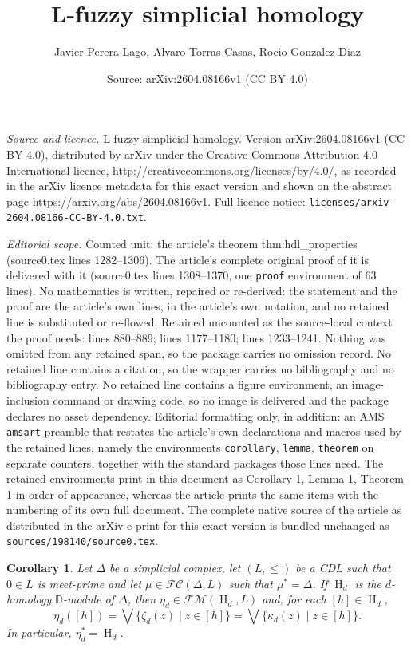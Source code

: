 \documentclass[10pt,a4paper]{amsart}
\title{L-fuzzy simplicial homology}
\author{Javier Perera-Lago, Alvaro Torras-Casas, Rocio Gonzalez-Diaz}
\date{Source: arXiv:2604.08166v1 (CC BY 4.0)}
\newtheorem{corollary}{Corollary}
\DeclareMathOperator{\Ho}{H}
\newcommand{\bbd}{\mathbb{D}}
\newcommand{\calfc}{\mathcal{FC}}
\newcommand{\calfm}{\mathcal{F\!M}}
\begin{document}
\maketitle

\noindent\emph{Source and licence.} L-fuzzy simplicial homology. Version arXiv:2604.08166v1 (CC BY 4.0), distributed by arXiv under the Creative Commons Attribution 4.0 International licence, http://creativecommons.org/licenses/by/4.0/, as recorded in the arXiv licence metadata for this exact version and shown on the abstract page https://arxiv.org/abs/2604.08166v1. Full licence notice: \texttt{licenses/arxiv-2604.08166-CC-BY-4.0.txt}.\par\smallskip

\noindent\textit{Editorial scope.} Counted unit: the article's theorem thm:hdl\_properties (source0.tex lines 1282--1306). The article's complete original proof of it is delivered with it (source0.tex lines 1308--1370, one \texttt{proof} environment of 63 lines). No mathematics is written, repaired or re-derived: the statement and the proof are the article's own lines, in the article's own notation, and no retained line is substituted or re-flowed.  Retained uncounted as the source-local context the proof needs: lines 880--889; lines 1177--1180; lines 1233--1241.  Nothing was omitted from any retained span, so the package carries no omission record.  No retained line contains a citation, so the wrapper carries no bibliography and no bibliography entry.  No retained line contains a figure environment, an image-inclusion command or drawing code, so no image is delivered and the package declares no asset dependency.  Editorial formatting only, in addition: an AMS \texttt{amsart} preamble that restates the article's own declarations and macros used by the retained lines, namely the environments \texttt{corollary}, \texttt{lemma}, \texttt{theorem} on separate counters, together with the standard packages those lines need.  The retained environments print in this document as Corollary 1, Lemma 1, Theorem 1 in order of appearance, whereas the article prints the same items with the numbering of its own full document.  The complete native source of the article as distributed in the arXiv e-print for this exact version is bundled unchanged as \texttt{sources/198140/source0.tex}.
\begin{corollary}
\label{cor:eta_value}
Let \(\Delta\) be a simplicial complex, let \((L,\leq)\) be a CDL such that \(0 \in L\) is meet-prime and let \(\mu \in \calfc(\Delta,L)\) such that  \(\mu^* = \Delta\). If \(\Ho_d\) is the \(d\)-homology \(\bbd\)-module of \(\Delta\), then \(\eta_d \in \calfm(\Ho_d,L)\) and, for each \([h] \in \Ho_d\),
\[
\eta_d([h]) =
\bigvee \{ \zeta_d(z) \mid z \in [h] \}
=\bigvee \{ \kappa_d(z) \mid z \in [h]\}.
\]
In particular, $\eta_d^*=\Ho_d$.
\end{corollary}
\end{document}
